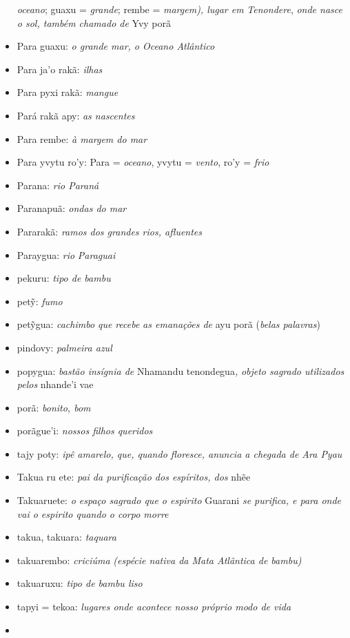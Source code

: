 \begin{itemize}
  \emph{oceano}; guaxu = \emph{grande}; rembe = \emph{margem), lugar em}
  \emph{Tenondere}, \emph{onde nasce o sol, também chamado de} Yvy porã
\item
  Para guaxu: \emph{o grande mar, o Oceano Atlântico}
\item
  Para ja'o rakã: \emph{ilhas}
\item
  Para pyxi rakã: \emph{mangue}
\item
  Pará rakã apy: \emph{as nascentes}
\item
  Para rembe: \emph{à margem do mar}
\item
  Para yvytu ro'y: Para = \emph{oceano}, yvytu = \emph{vento}, ro'y =
  \emph{frio}
\item
  Parana: \emph{rio Paraná}
\item
  Paranapuã: \emph{ondas do mar}
\item
  Pararakã: \emph{ramos dos grandes rios, afluentes}
\item
  Paraygua: \emph{rio} \emph{Paraguai}
\item
  pekuru: \emph{tipo de bambu}
\item
  petỹ: \emph{fumo}
\item
  petỹgua: \emph{cachimbo que} \emph{recebe} \emph{as emanações de} ayu
  porã (\emph{belas palavras})
\item
  pindovy: \emph{palmeira azul}
\item
  popygua: \emph{bastão insígnia de} Nhamandu
  tenondegua\emph{,} \emph{objeto sagrado utilizados pelos} nhande'i vae
\item
  porã: \emph{bonito, bom}
\item
  porãgue'i: \emph{nossos filhos queridos}
\item
  tajy poty: \emph{ipê amarelo, que, quando floresce, anuncia a chegada
  de Ara Pyau}
\item
  Takua ru ete: \emph{pai da purificação dos espíritos, dos} nhẽe
\item
  Takuaruete: \emph{o espaço sagrado que o espirito} Guarani \emph{se
  purifica, e para onde vai o espirito quando o corpo morre}
\item
  takua, takuara: \emph{taquara}
\item
  takuarembo: \emph{criciúma} \emph{(espécie nativa da Mata Atlântica de
  bambu)}
\item
  takuaruxu: \emph{tipo de bambu liso}
\item
  tapyi = tekoa: \emph{lugares onde acontece nosso próprio modo de vida}
\item

\end{itemize}
